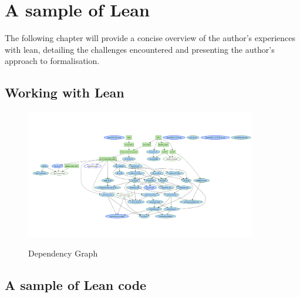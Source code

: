 \chapter{A sample of Lean}
The following chapter will provide a concise overview of the author's experiences with lean, 
detailing the challenges encountered and presenting the author's approach to formalisation.
\section{Working with Lean}

\clearpage
\begin{figure}[h]
    \centering
    \includegraphics[angle=90, width=0.9\textwidth]{DependencyGraph}
    \label{fig:DependencyGraph}
    \caption{Dependency Graph}
\end{figure}
\clearpage
\section{A sample of Lean code}